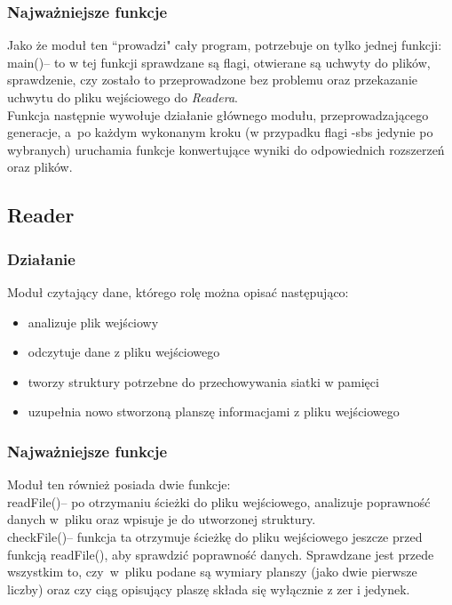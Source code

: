 \documentclass{article}
\begin{document}
\subsubsection{Najważniejsze funkcje}
Jako że moduł ten ``prowadzi" cały program, potrzebuje on tylko jednej funkcji:\\
{\selectfont main()}-- to w tej funkcji sprawdzane są
flagi, otwierane są uchwyty do plików, sprawdzenie, czy zostało to przeprowadzone bez problemu
oraz przekazanie uchwytu do pliku wejściowego do \textit{Readera}.\\
Funkcja następnie wywołuje działanie głównego modułu, przeprowadzającego generacje, a~po każdym
wykonanym kroku (w przypadku flagi -sbs jedynie po wybranych) uruchamia funkcje
konwertujące wyniki do odpowiednich rozszerzeń oraz plików.

\subsection{Reader}
\subsubsection{Działanie}
Moduł czytający dane, którego rolę można opisać następująco:
\begin{itemize}
  \item analizuje plik wejściowy
  \item odczytuje dane z pliku wejściowego
  \item tworzy struktury potrzebne do przechowywania siatki w pamięci
  \item uzupełnia nowo stworzoną planszę informacjami z pliku wejściowego
\end{itemize}
\subsubsection{Najważniejsze funkcje}
Moduł ten również posiada dwie funkcje:\\
{\selectfont readFile()}-- po otrzymaniu ścieżki do pliku wejściowego, analizuje
poprawność danych w~pliku oraz wpisuje je do utworzonej struktury.\\
{\selectfont checkFile()}-- funkcja ta otrzymuje ścieżkę do pliku wejściowego
jeszcze przed funkcją readFile(), aby sprawdzić poprawność danych. Sprawdzane jest przede wszystkim
to, czy~w~pliku podane są wymiary planszy (jako dwie pierwsze liczby) oraz czy ciąg opisujący
plaszę składa się wyłącznie z zer i jedynek.
\end{document}
